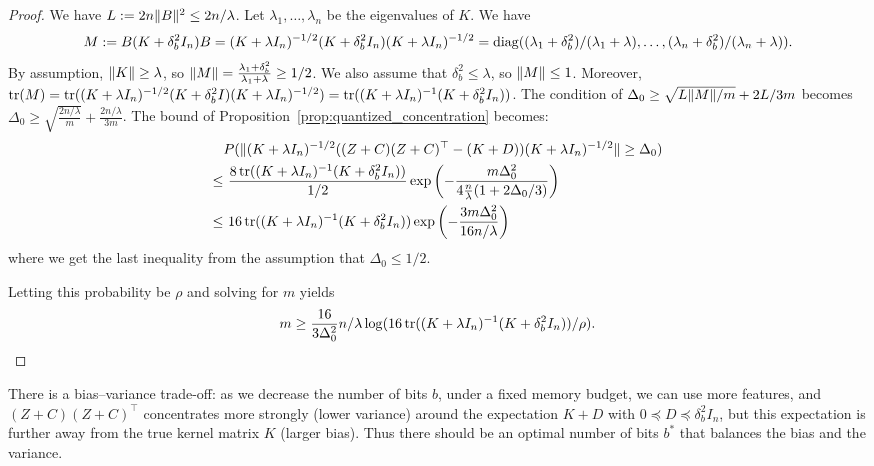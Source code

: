 \begin{proof}
  We have $L := 2n \|B\|^2 \leq 2n/\lambda$.
  Let $\lambda_1, \dots, \lambda_n$ be the eigenvalues of $K$.
  We have
  \begin{equation*}
    M \defeq B(K + \delta^2_b I_n) B =  (K + \lambda I_n)^{-1/2} (K + \delta^2_b I_n) (K + \lambda
    I_n)^{-1/2} = \diag((\lambda_1 + \delta^2_b)/(\lambda_1 + \lambda), \dots,
    (\lambda_n + \delta^2_b) / (\lambda_n + \lambda)).
  \end{equation*}
  By assumption, $\|K\| \geq \lambda$, so $\|M\| = \frac{\lambda_1 + \delta^2_b}{\lambda_1 + \lambda} \geq
  1/2$.
  We also assume that $\delta^2_b \leq \lambda$, so $\|M\| \leq 1$.
  Moreover, $\mathop{\rm tr}(M) = \mathop{\rm tr}((K + \lambda I_n)^{-1/2} (K + \delta^2_b I) (K + \lambda I_n)^{-1/2}) =
  \mathop{\rm tr}((K + \lambda I_n)^{-1} (K + \delta^2_b I_n))$.
  The condition of $\Delta_0 \geq \sqrt{L \|M\| / m} + 2L/3m$ becomes $\Delta_0 \geq \sqrt{\frac{2n/\lambda}{m}} + \frac{2n/\lambda}{3m}$.
  The bound of Proposition~\ref{prop:quantized_concentration} becomes:
  \begin{align*}
    &P(\|(K + \lambda I_n)^{-1/2} ((Z + C) (Z + C)^\top - (K + D)) (K + \lambda
      I_n)^{-1/2}\| \geq \Delta_0) \\
    \leq&\ \frac{8 \mathop{\rm tr}((K + \lambda I_n)^{-1} (K + \delta^2_b I_n))}{1/2} \exp \left( -\frac{m
      \Delta_0^2}{4\frac{n}{\lambda} (1 + 2\Delta_0/3)} \right) \\
    \leq&\ 16 \mathop{\rm tr}((K + \lambda I_n)^{-1} (K + \delta^2_b I_n)) \exp \left( -\frac{3m\Delta_0^2}{16n/\lambda} \right)
  \end{align*}
  where we get the last inequality from the assumption that $\Delta_0 \leq 1/2$.

  Letting this probability be $\rho$ and solving for $m$ yields
  \begin{equation*}
    m \geq \frac{16}{3 \Delta_0^2} n/\lambda \log (16 \mathop{\rm tr}((K + \lambda I_n)^{-1} (K + \delta^2_b I_n)) / \rho).
  \end{equation*}

\end{proof}

There is a bias--variance trade-off: as we decrease the number of bits $b$, under
a fixed memory budget, we can use more features, and $(Z + C)(Z + C)^\top$
concentrates more strongly (lower variance) around the expectation $K + D$ with
$0 \preceq D \preceq \delta^2_b I_n$, but this expectation is further away from the true kernel
matrix $K$ (larger bias).
Thus there should be an optimal number of bits $b^*$ that balances the bias and
the variance.

